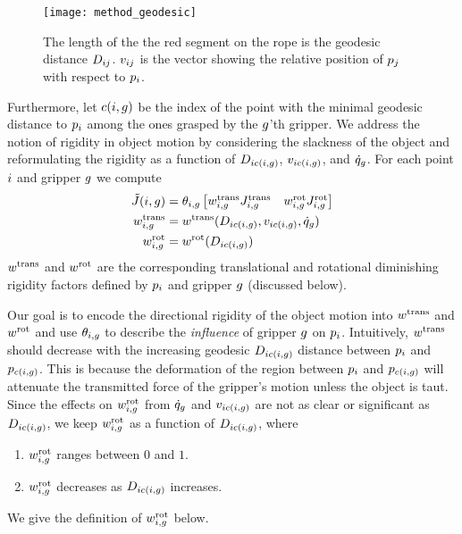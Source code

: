\begin{figure}[ht]
    \centering
    \texttt{[image: method\_geodesic]}
    \caption{The length of the the red segment on the rope is the geodesic distance $D_{i j}$. $v_{i j}$ is the vector showing the relative position of $p_j$ with respect to $p_i$. }
    \label{fig:distance_vec_defs}
\end{figure}

Furthermore, let $c(i, g)$ be the index of the point with the minimal geodesic distance to $p_i$ among the ones grasped by the $g$'th gripper. We address the notion of rigidity in object motion by considering the slackness of the object and reformulating the rigidity as a function of $D_{i c(i, g)}$, $v_{i c(i, g)}$, and $\dot{q}_g$. For each point $i$ and gripper $g$ we compute
\begin{equation}
\begin{split}
    \tilde {J}(i, g) 
                        &= \theta_{i, g} \begin{bmatrix} w^{\textrm{trans}}_{i, g} J^{\textrm{trans}}_{i, g} & w^{\textrm{rot}}_{i, g} J^{\textrm{rot}}_{i, g} \end{bmatrix} \\
    w^{\textrm{trans}}_{i, g}    &= w^{\textrm{trans}}(D_{i c(i, g)}, v_{i c(i, g)}, \dot{q}_g) \\
    w^{\textrm{rot}}_{i, g}      &= w^{\textrm{rot}}(D_{i c(i, g)}) \\
\end{split}
\label{eq:trans_rot_rigidity_diminishing_jacobian}
\end{equation}
$w^{\textrm{trans}}$ and $w^{\textrm{rot}}$ are the corresponding translational and rotational diminishing rigidity factors defined by $p_i$ and gripper $g$ (discussed below). 

Our goal is to encode the directional rigidity of the object motion into $w^{\textrm{trans}}$ and $w^{\textrm{rot}}$ and use $\theta_{i, g}$ to describe the \textit{influence} of gripper $g$ on $p_i$. Intuitively, $w^{\textrm{trans}}$ should decrease with the increasing geodesic $D_{i c(i, g)}$ distance between $p_i$ and $p_{c(i, g)}$. This is because the deformation of the region between $p_i$ and $p_{c(i, g)}$ will attenuate the transmitted force of the gripper's motion unless the object is taut. Since the effects on $w^{\textrm{rot}}_{i, g}$ from $\dot{q}_g$ and $v_{i c(i, g)}$ are not as clear or significant as $D_{i c(i, g)}$, we keep $w^{\textrm{rot}}_{i, g}$ as a function of $D_{i c(i, g)}$, where 
\begin{enumerate}
    \item $w^{\textrm{rot}}_{i, g}$ ranges between $0$ and $1$.
    \item $w^{\textrm{rot}}_{i, g}$ decreases as $D_{i c(i, g)}$ increases.
\end{enumerate}
We give the definition of $w^{\textrm{rot}}_{i, g}$ below.

